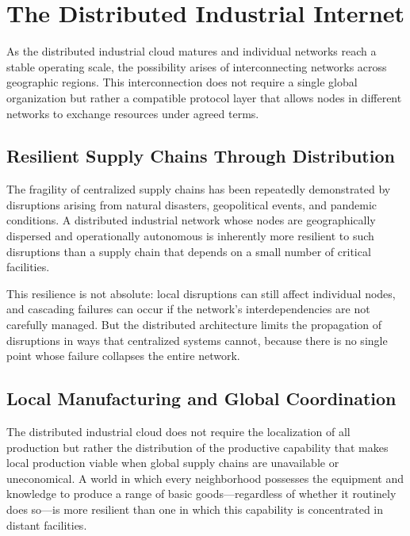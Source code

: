 \documentclass[12pt]{book}
\theoremstyle{definition}
\theoremstyle{remark}
\begin{document}
\chapter{The Distributed Industrial Internet}

As the distributed industrial cloud matures and individual networks
reach a stable operating scale, the possibility arises of
interconnecting networks across geographic regions. This
interconnection does not require a single global organization but
rather a compatible protocol layer that allows nodes in different
networks to exchange resources under agreed terms.

\section{Resilient Supply Chains Through Distribution}

The fragility of centralized supply chains has been repeatedly
demonstrated by disruptions arising from natural disasters,
geopolitical events, and pandemic conditions. A distributed
industrial network whose nodes are geographically dispersed and
operationally autonomous is inherently more resilient to such
disruptions than a supply chain that depends on a small number of
critical facilities.

This resilience is not absolute: local disruptions can still affect
individual nodes, and cascading failures can occur if the network's
interdependencies are not carefully managed. But the distributed
architecture limits the propagation of disruptions in ways that
centralized systems cannot, because there is no single point whose
failure collapses the entire network.

\section{Local Manufacturing and Global Coordination}

The distributed industrial cloud does not require the localization
of all production but rather the distribution of the productive
capability that makes local production viable when global supply
chains are unavailable or uneconomical. A world in which every
neighborhood possesses the equipment and knowledge to produce a
range of basic goods---regardless of whether it routinely does
so---is more resilient than one in which this capability is
concentrated in distant facilities.
\end{document}
